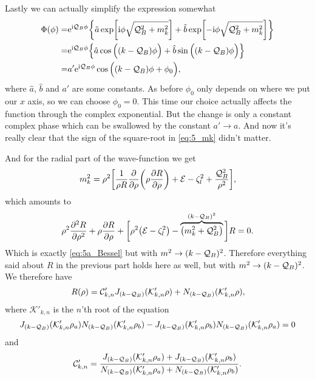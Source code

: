 \documentclass[11pt,letter, swedish, english
]{article}
\begin{document}
Lastly we can actually simplify the expression somewhat
\begin{equation}
\begin{aligned}
\Phi(\phi)=&\mathrm{e}^{\mathrm{i}\mathcal{Q}_B\phi}\qty{
\tilde{a}\exp[\mathrm{i}\phi\sqrt{\ensuremath{\mathcal{Q}_B}^2+m_k^2}]
+\tilde{b}\exp[-\mathrm{i}\phi\sqrt{\ensuremath{\mathcal{Q}_B}^2+m_k^2}]}\\
=&\mathrm{e}^{\mathrm{i}\mathcal{Q}_B\phi}\qty{
\hat{a}\cos\Big((k-\ensuremath{\mathcal{Q}_B})\phi\Big)
+\hat{b}\sin\Big((k-\ensuremath{\mathcal{Q}_B})\phi\Big)}\\
=&a'\mathrm{e}^{\mathrm{i}\mathcal{Q}_B\phi}
\cos\Big((k-\mathcal{Q}_B)\phi+\phi_0\Big),
\end{aligned}
\end{equation}
where $\hat{a}$, $\hat{b}$ and $a'$ are some constants. As before
$\phi_0$ only depends on where we put our $x$ axis, so we can choose
$\phi_0=0$. This time our choice actually affects the function through
the complex exponential. But the change is only a constant complex
phase which can be swallowed by the constant $a'\to a$. And now it's
really clear that the sign of the square-root in \eqref{eq:5_mk} didn't
matter. 

And for the radial part of the wave-function we get
\begin{equation}
m^2_k=\rho^2\qty[\frac{1}{\rho R}\pdv{\rho}
\qty(\rho\pdv{R}{\rho})+\mathcal{E}-\zeta_l^2+\frac{\mathcal{Q}_B^2}{\rho^2}],
\end{equation}
which amounts to
\vspace{-4mm}\begin{equation}
\rho^2\pdv[2]{R}{\rho}
+\rho\pdv{R}{\rho}+\bigg[\rho^2\qty(\mathcal{E}-\zeta_l^2)
-\overbrace{\qty(m_k^2+\mathcal{Q}_B^2)}^{(k-\mathcal{Q}_B)^2}\bigg]R=0.
\end{equation}
Which is exactly \eqref{eq:5a_Bessel} but with
$m^2\to(k-\mathcal{Q}_B)^2$. Therefore everything said about $R$ in the
previous part holds here as well, but with $m^2\to(k-\mathcal{Q}_B)^2$.
We therefore have
\begin{equation}
R(\rho)=\mathcal{C}'_{k, n}
J_{(k-\mathcal{Q}_B)}(\mathcal{K}'_{k,n}\rho)
+N_{(k-\mathcal{Q}_B)}(\mathcal{K}'_{k,n}\rho),
\end{equation}
where $\mathcal{K}'_{k,n}$ is the $n$'th root of the equation
\begin{equation}\label{eq:5b_K}
J_{(k-\mathcal{Q}_B)}(\mathcal{K}'_{k,n}\rho_a)N_{(k-\mathcal{Q}_B)}(\mathcal{K}'_{k,n}\rho_b)
-J_{(k-\mathcal{Q}_B)}(\mathcal{K}'_{k,n}\rho_b)N_{(k-\mathcal{Q}_B)}(\mathcal{K}'_{k,n}\rho_a)=0
\end{equation}
and
\begin{equation}\label{eq:5b_C}
\mathcal{C}'_{k,n}=
\frac{J_{(k-\mathcal{Q}_B)}(\mathcal{K}'_{k,n}\rho_a)+J_{(k-\mathcal{Q}_B)}(\mathcal{K}'_{k,n}\rho_b)}
{N_{(k-\mathcal{Q}_B)}(\mathcal{K}'_{k,n}\rho_a)+N_{(k-\mathcal{Q}_B)}(\mathcal{K}'_{k,n}\rho_b)}.
\end{equation}
\end{document}
